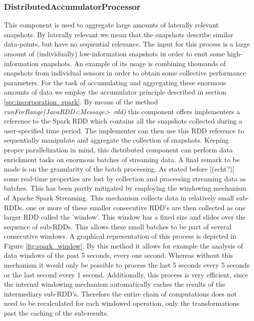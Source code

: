 \subsubsection{DistributedAccumulatorProcessor}
This component is used to aggregate large amounts of laterally relevant snapshots. By laterally relevant we mean that the snapshots describe similar data-points, but have no sequential relevance. The input for this process is a large amount of (individually) low-information snapshots in order to emit some high-information snapshots. An example of its usage is combining thousands of snapshots from individual sensors in order to obtain some collective performance parameters. For the task of accumulating and aggregating these enormous amounts of data we employ the accumulator principle described in section \ref{sec:incorporation_spark}. By means of the method \emph{runForRange(JavaRDD\textless Message\textgreater\ rdd)} this component offers implementers a reference to the Spark RDD which contains all the snapshots collected during a user-specified time period. The implementer can then use this RDD reference to sequentially manipulate and aggregate the collection of snapshots. Keeping proper parallelization in mind, this distributed component can perform data enrichment tasks on enormous batches of streaming data.
A final remark to be made is on the granularity of the batch processing. As stated before [(echt?)] some real-time properties are lost by collection and processing streaming data as batches. This has been partly mitigated by employing the windowing mechanism of Apache Spark Streaming. This mechanism collects data in relatively small sub-RDDs. one or more of these smaller consecutive RDD's are then collected as one larger RDD called the 'window'. This window has a fixed size and slides over the sequence of sub-RDDs. This allows these small batches to be part of several consecutive windows. A graphical representation of this process is depicted in Figure \ref{fig:spark_window}. By this method it allows for example the analysis of data windows of the past 5 seconds, every one second. Whereas without this mechanism it would only be possible to process the last 5 seconds every 5 seconds or the last second every 1 second. Additionally, this process is very efficient, since the internal windowing mechanism automatically caches the results of the intermediary sub-RDD's. Therefore the entire chain of computations does not need to be recalculated for each windowed operation, only the transformations past the caching of the sub-results.

